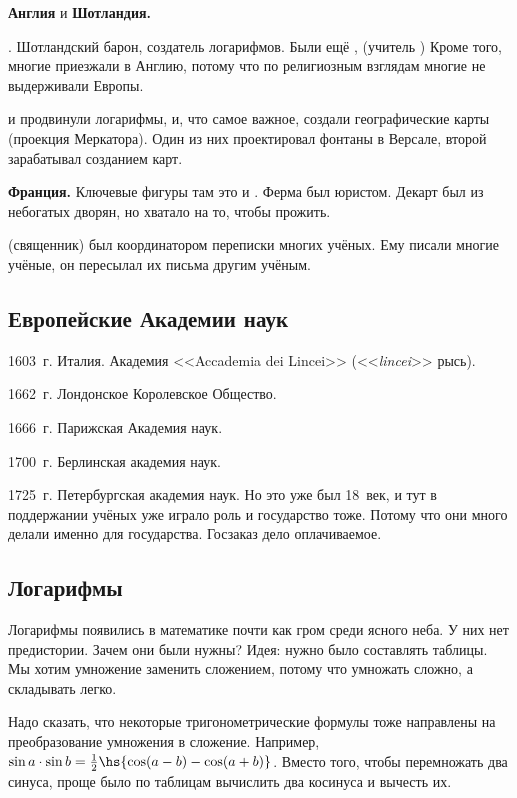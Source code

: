\documentclass[a4paper,oneside,fleqn,10pt]{article}
\begin{document}
\textbf{Англия} и \textbf{Шотландия.}

. Шотландский барон, создатель логарифмов.
Были ещё ,  (учитель )
Кроме того, многие приезжали в Англию, потому что по религиозным
взглядам многие не выдерживали Европы.

 и  продвинули логарифмы, и, что самое важное,
создали географические карты (проекция Меркатора).
Один из них проектировал фонтаны в Версале, второй зарабатывал созданием
карт.

\textbf{Франция.} Ключевые фигуры там это  и .
Ферма был юристом. Декарт был из небогатых дворян,
но хватало на то, чтобы прожить.

 (священник) был координатором переписки многих учёных.
Ему писали многие учёные, он пересылал их письма другим учёным.

\subsection{Европейские Академии наук}

\begin{items}{-2}
\item 1603~г. Италия. Академия <<Accademia dei Lincei>> (<<\emph{lincei}>> рысь).
\item 1662~г. Лондонское Королевское Общество.
\item 1666~г. Парижская Академия наук.
\item 1700~г. Берлинская академия наук.
\item 1725~г. Петербургская академия наук.
Но это уже был 18~век, и тут в поддержании учёных уже играло роль и государство тоже.
Потому что они много делали именно для государства. Госзаказ дело оплачиваемое.
\end{items}


\subsection{Логарифмы}

Логарифмы появились в математике почти как гром среди ясного неба.
У них нет предистории. Зачем они были нужны? Идея: нужно было составлять таблицы.
Мы хотим умножение заменить сложением, потому что умножать сложно, а складывать легко.

Надо сказать, что некоторые тригонометрические формулы тоже направлены на преобразование
умножения в сложение. Например,
$\sin a \cdot \sin b = \frac12 \hs{\cos(a-b) - \cos(a+b)}$. Вместо того, чтобы
перемножать два синуса, проще было по таблицам вычислить два косинуса и вычесть их.
\end{document}
